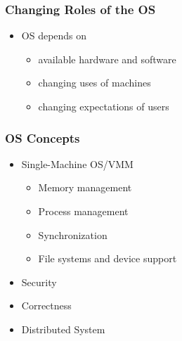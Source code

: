 \begin{frame}[plain]	
	\frametitle{Changing Roles of the OS}
	
	\begin{itemize}\Large
		\item OS depends on
		\begin{itemize}\large
			\item available hardware and software
			\item changing uses of machines
			\item changing expectations of users
			
		\end{itemize}
	\end{itemize}
	
	
\end{frame}

\begin{frame}[plain]	
	\frametitle{OS Concepts}
	
	\begin{itemize}\Large
		\item Single-Machine OS/VMM
		\begin{itemize}\large
			\item Memory management
			\item Process management
			\item Synchronization
			\item File systems and device support
			
		\end{itemize}
		\item Security
		\item Correctness
		\item Distributed System
	\end{itemize}
	
	
\end{frame}


